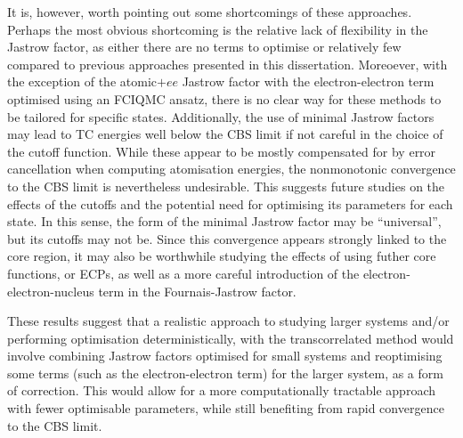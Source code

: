It is, however, worth pointing out some shortcomings of these approaches. Perhaps the most obvious shortcoming is the relative lack of flexibility in the Jastrow factor, as either there are no terms to optimise or relatively few compared to previous approaches presented in this dissertation. Moreoever, with the exception of the atomic$+ee$ Jastrow factor with the electron-electron term optimised using an FCIQMC ansatz, there is no clear way for these methods to be tailored for specific states. Additionally, the use of minimal Jastrow factors may lead to TC energies well below the CBS limit if not careful in the choice of the cutoff function. While these appear to be mostly compensated for by error cancellation when computing atomisation energies, the nonmonotonic convergence to the CBS limit is nevertheless undesirable. This suggests future studies on the effects of the cutoffs and the potential need for optimising its parameters for each state. In this sense, the form of the minimal Jastrow factor may be ``universal'', but its cutoffs may not be. Since this convergence appears strongly linked to the core region, it may also be worthwhile studying the effects of using futher core functions, or \glspl{ECP}, as well as a more careful introduction of the electron-electron-nucleus term in the Fournais-Jastrow factor.

These results suggest that a realistic approach to studying larger systems and/or performing optimisation deterministically, with the transcorrelated method would involve combining Jastrow factors optimised for small systems and reoptimising some terms (such as the electron-electron term) for the larger system, as a form of correction. This would allow for a more computationally tractable approach with fewer optimisable parameters, while still benefiting from rapid convergence to the CBS limit.
